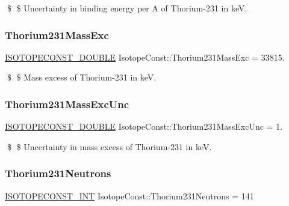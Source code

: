 \$ \$ Uncertainty in binding energy per A of Thorium-\/231 in keV. \mbox{\label{group___isotope_const-_thorium-_th231_ga07a976476596d550dbf3a9025a899ed3}} 
\subsubsection{\texorpdfstring{Thorium231\+Mass\+Exc}{Thorium231MassExc}}
{\footnotesize\ttfamily \mbox{\hyperlink{group___isotope_const-_macros_ga8f45a7272ce02c0b4c65c44636ed719a}{I\+S\+O\+T\+O\+P\+E\+C\+O\+N\+S\+T\+\_\+\+D\+O\+U\+B\+LE}} Isotope\+Const\+::\+Thorium231\+Mass\+Exc = 33815.}

\$ \$ Mass excess of Thorium-\/231 in keV. \mbox{\label{group___isotope_const-_thorium-_th231_ga6b6125575f15f2ef3fecdc0529f7b63a}} 
\subsubsection{\texorpdfstring{Thorium231\+Mass\+Exc\+Unc}{Thorium231MassExcUnc}}
{\footnotesize\ttfamily \mbox{\hyperlink{group___isotope_const-_macros_ga8f45a7272ce02c0b4c65c44636ed719a}{I\+S\+O\+T\+O\+P\+E\+C\+O\+N\+S\+T\+\_\+\+D\+O\+U\+B\+LE}} Isotope\+Const\+::\+Thorium231\+Mass\+Exc\+Unc = 1.}

\$ \$ Uncertainty in mass excess of Thorium-\/231 in keV. \mbox{\label{group___isotope_const-_thorium-_th231_gaee6d9c02dd0d398b339b70b1283f60be}} 
\subsubsection{\texorpdfstring{Thorium231\+Neutrons}{Thorium231Neutrons}}
{\footnotesize\ttfamily \mbox{\hyperlink{group___isotope_const-_macros_ga5f18360b3e99483a35c32d789e62621c}{I\+S\+O\+T\+O\+P\+E\+C\+O\+N\+S\+T\+\_\+\+I\+NT}} Isotope\+Const\+::\+Thorium231\+Neutrons = 141}

